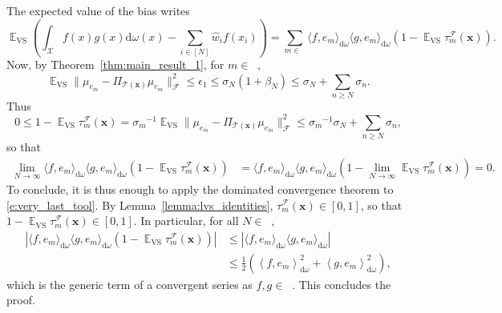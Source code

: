 \documentclass[twoside,11pt]{book}
\numberwithin{theorem}{chapter}
\numberwithin{definition}{chapter}
\numberwithin{proposition}{chapter}
\numberwithin{corollary}{chapter}
\numberwithin{example}{chapter}
\numberwithin{lemma}{chapter}
\DeclareMathOperator{\VS}{\mathrm{VS}}
\DeclareMathOperator{\EX}{\mathbb{E}}
\DeclareMathOperator{\F}{\mathcal{F}}
\DeclareMathOperator{\X}{\mathcal{X}}
\DeclareMathOperator{\Ltwo}{\mathbb{L}_{2}(\mathrm{d} \omega)}
\DeclareMathOperator{\Ns}{\mathbb{N}^{*}}
\begin{document}
The expected value of the bias writes
\begin{equation}
\EX_{\VS} \left( \int_{\X} f(x)g(x) \mathrm{d}\omega(x) - \sum\limits_{i \in [N]} \widehat{w}_{i}f(x_{i}) \right)= \sum\limits_{m \in \Ns} \langle f,e_{m} \rangle_{\mathrm{d}\omega}\langle g,e_{m} \rangle_{\mathrm{d}\omega} \left( 1- \EX_{\VS}\tau_{m}^{\F}(\bm{x}) \right).
\label{e:very_last_tool}
\end{equation}
Now, by Theorem~\ref{thm:main_result_1}, for $m \in \Ns$,
\begin{equation}
\EX_{\VS} \|\mu_{e_{m}} - \Pi_{\mathcal{T}(\bm{x})} \mu_{e_{m}}\|_{\F}^{2} \leq \epsilon_{1} \leq \sigma_{N}(1+\beta_{N}) \leq \sigma_{N} + \sum\limits_{n \geq N} \sigma_{n}.
\end{equation}
Thus
\begin{equation}
0 \leq 1-\EX_{\VS} \tau_{m}^{\F}(\bm{x}) = {\sigma_m}^{-1} \EX_{\VS} \|\mu_{e_{m}} - \Pi_{\mathcal{T}(\bm{x})} \mu_{e_{m}}\|_{\F}^{2} \leq {\sigma_{m}}^{-1}{\sigma_{N} + \sum\limits_{n \geq N} \sigma_{n}},
\end{equation}
so that
\begin{align}
\lim_{N \rightarrow \infty} \langle f,e_{m} \rangle_{\mathrm{d}\omega}\langle g,e_{m} \rangle_{\mathrm{d}\omega} \left(1- \EX_{\VS}\tau_{m}^{\F}(\bm{x}) \right) & = \langle f,e_{m} \rangle_{\mathrm{d}\omega}\langle g,e_{m} \rangle_{\mathrm{d}\omega} (1-\lim_{N \rightarrow \infty} \EX_{\VS}\tau_{m}^{\F}(\bm{x})) = 0.
\end{align}
To conclude, it is thus enough to apply the dominated convergence theorem to \eqref{e:very_last_tool}. By Lemma~\ref{lemma:lvs_identities}, $\tau_{m}^{\F}(\bm{x}) \in [0,1]$, so that $1-\EX_{\VS}\tau_{m}^{\F}(\bm{x}) \in [0,1]$.
In particular, for all $N \in \Ns$,
\begin{align}
|\langle f,e_{m} \rangle_{\mathrm{d}\omega}\langle g,e_{m} \rangle_{\mathrm{d}\omega} \left(1- \EX_{\VS}\tau_{m}^{\F}(\bm{x}) \right)| & \leq |\langle f,e_{m} \rangle_{\mathrm{d}\omega}\langle g,e_{m} \rangle_{\mathrm{d}\omega}|\\
& \leq \frac{1}{2}\left(\left\langle f,e_{m} \right\rangle_{\mathrm{d}\omega}^{2} + \left\langle g,e_{m} \right\rangle_{\mathrm{d}\omega}^{2}\right),
\end{align}
which is the generic term of a convergent series as $f,g\in\Ltwo$. This concludes the proof.
\end{document}
